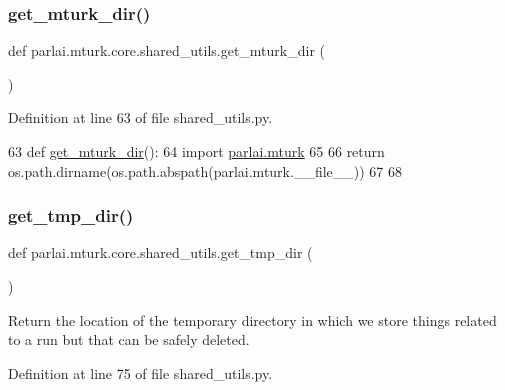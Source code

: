 \subsubsection{\texorpdfstring{get\+\_\+mturk\+\_\+dir()}{get\_mturk\_dir()}}
{\footnotesize\ttfamily def parlai.\+mturk.\+core.\+shared\+\_\+utils.\+get\+\_\+mturk\+\_\+dir (\begin{DoxyParamCaption}{ }\end{DoxyParamCaption})}



Definition at line 63 of file shared\+\_\+utils.\+py.


\begin{DoxyCode}
63 \textcolor{keyword}{def }\hyperlink{namespaceparlai_1_1mturk_1_1core_1_1shared__utils_aabd480fc6090e1fa769ff3926f7e842d}{get\_mturk\_dir}():
64     \textcolor{keyword}{import} \hyperlink{namespaceparlai_1_1mturk}{parlai.mturk}
65 
66     \textcolor{keywordflow}{return} os.path.dirname(os.path.abspath(parlai.mturk.\_\_file\_\_))
67 
68 
\end{DoxyCode}
\mbox{\label{namespaceparlai_1_1mturk_1_1core_1_1shared__utils_aa0c7ddb9db866e2f19ec6a83112fc9d2}} 
\subsubsection{\texorpdfstring{get\+\_\+tmp\+\_\+dir()}{get\_tmp\_dir()}}
{\footnotesize\ttfamily def parlai.\+mturk.\+core.\+shared\+\_\+utils.\+get\+\_\+tmp\+\_\+dir (\begin{DoxyParamCaption}{ }\end{DoxyParamCaption})}

\begin{DoxyVerb}Return the location of the temporary directory in which we store things related to a
run but that can be safely deleted.
\end{DoxyVerb}
 

Definition at line 75 of file shared\+\_\+utils.\+py.


